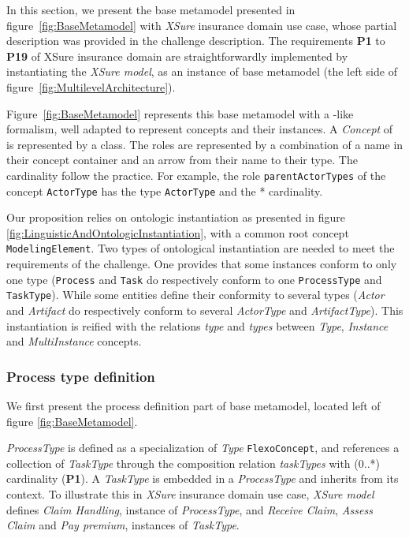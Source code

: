 In this section, we present the base metamodel presented in figure~\ref{fig:BaseMetamodel} with \textit{XSure} insurance domain use case, whose partial description was provided in the challenge description. The requirements \textbf{P1} to \textbf{P19} of XSure insurance domain are straightforwardly implemented by instantiating the \emph{XSure model}, as an instance of base metamodel (the left side of figure~\ref{fig:MultilevelArchitecture}).

Figure~\ref{fig:BaseMetamodel} represents this base metamodel with a \UML-like formalism, well adapted to represent \FML concepts and their instances. A \textit{Concept} of \FML is represented by a \UML class. The roles are represented by a combination of a name in their concept container and an arrow from their name to their type. The cardinality follow the \UML practice.
For example, the role \texttt{parentActorTypes} of the concept \texttt{ActorType} has the type \texttt{ActorType} and the * cardinality.

Our proposition relies on ontologic instantiation as presented in figure \ref{fig:LinguisticAndOntologicInstantiation}, with a common root concept \texttt{ModelingElement}. Two types of ontological instantiation are needed to meet the requirements of the challenge. One provides that some instances conform to only one type (\texttt{Process} and \texttt{Task} do respectively conform to one \texttt{ProcessType} and \texttt{TaskType}). While some entities define their conformity to several types (\textit{Actor} and \textit{Artifact} do respectively conform to several \textit{ActorType} and \textit{ArtifactType}). This instantiation is reified with the relations \textit{type} and \textit{types} between \textit{Type}, \textit{Instance} and \textit{MultiInstance} concepts.  

\subsubsection{Process type definition}

We first present the process definition part of base metamodel, located left of figure \ref{fig:BaseMetamodel}.


\textit{ProcessType} is defined as a specialization of \textit{Type} \texttt{FlexoConcept}, and references a collection of \textit{TaskType} through the composition relation \textit{taskTypes} with (0..*) cardinality (\textbf{P1}). A \textit{TaskType} is embedded in a \textit{ProcessType} and inherits from its context. To illustrate this in \textit{XSure} insurance domain use case, \textit{XSure model} defines \textit{Claim Handling}, instance of \textit{ProcessType}, and \textit{Receive Claim}, \textit{Assess Claim} and \textit{Pay premium}, instances of \textit{TaskType}.

